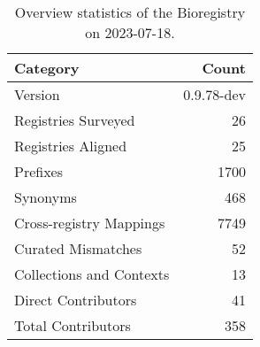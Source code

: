 \begin{table}
\caption{Overview statistics of the Bioregistry on 2023-07-18.}
\label{tab:bioregistry-summary}
\begin{tabular}{lr}
\toprule
Category & Count \\
\midrule
Version & 0.9.78-dev \\
Registries Surveyed & 26 \\
Registries Aligned & 25 \\
Prefixes & 1700 \\
Synonyms & 468 \\
Cross-registry Mappings & 7749 \\
Curated Mismatches & 52 \\
Collections and Contexts & 13 \\
Direct Contributors & 41 \\
Total Contributors & 358 \\
\bottomrule
\end{tabular}
\end{table}
